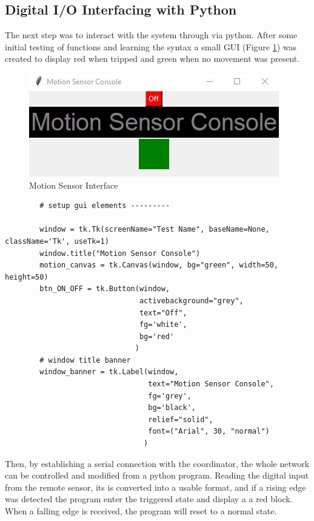 	\subsection{Digital I/O Interfacing with Python}
	The next step was to interact with the system through via python. After some initial testing of functions and learning the syntax a small GUI (Figure \ref{fig:motGui}) was created to display red when tripped and green when no movement was present. 
	\begin{figure}[h]
		\includegraphics[width=\linewidth]{motionGui.jpg}
		\caption{Motion Sensor Interface}
		\label{fig:motGui}
	\end{figure}
\newpage
	\begin{lstlisting}
		# setup gui elements ---------
		
		window = tk.Tk(screenName="Test Name", baseName=None, className='Tk', useTk=1)
		window.title("Motion Sensor Console")
		motion_canvas = tk.Canvas(window, bg="green", width=50, height=50)
		btn_ON_OFF = tk.Button(window,
							   activebackground="grey",
							   text="Off",
							   fg='white',
							   bg='red'
							  )
		# window title banner
		window_banner = tk.Label(window,
								 text="Motion Sensor Console",
								 fg='grey',
								 bg='black',
								 relief="solid",
								 font=("Arial", 30, "normal")
								)
	\end{lstlisting}
		Then, by establishing a serial connection with the coordinator, the whole network can be controlled and modified from a python program. Reading the digital input from the remote sensor, its is converted into a usable format, and if a rising edge was detected the program enter the triggered state and display a a red block. When a falling edge is received, the program will reset to a normal state. 
